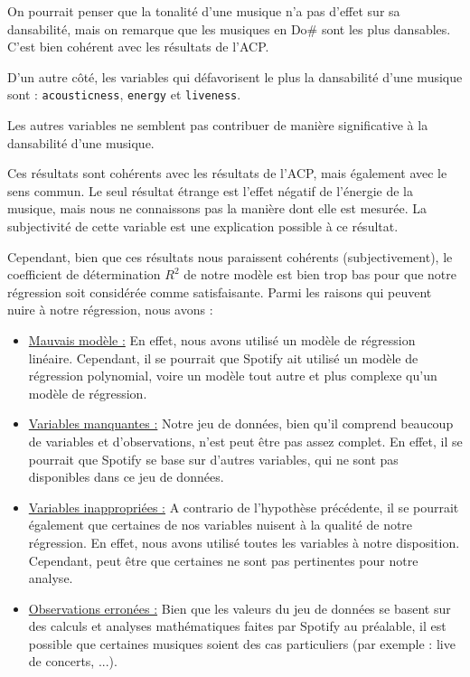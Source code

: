 \documentclass[a4paper, 12pt]{report}
\begin{document}
On pourrait penser que la tonalité d'une musique n'a pas d'effet sur sa dansabilité, mais on remarque que les musiques en Do\# sont les plus dansables. C'est bien cohérent avec les résultats de l'ACP.

D'un autre côté, les variables qui défavorisent le plus la dansabilité d'une musique sont : \verb|acousticness|, \verb|energy| et \verb|liveness|.

Les autres variables ne semblent pas contribuer de manière significative à la dansabilité d'une musique.

Ces résultats sont cohérents avec les résultats de l'ACP, mais également avec le sens commun. Le seul résultat étrange est l'effet négatif de l'énergie de la musique, mais nous ne connaissons pas la manière dont elle est mesurée. La subjectivité de cette variable est une explication possible à ce résultat.

Cependant, bien que ces résultats nous paraissent cohérents (subjectivement), le coefficient de détermination $R^2$ de notre modèle est bien trop bas pour que notre régression soit considérée comme satisfaisante. Parmi les raisons qui peuvent nuire à notre régression, nous avons : 

\begin{itemize}
    \item  \underline{Mauvais modèle :} En effet, nous avons utilisé un modèle de régression linéaire. Cependant, il se pourrait que Spotify ait utilisé un modèle de régression polynomial, voire un modèle tout autre et plus complexe qu'un modèle de régression.
    \item \underline{Variables manquantes :} Notre jeu de données, bien qu'il comprend beaucoup de variables et d'observations, n'est peut être pas assez complet. En effet, il se pourrait que Spotify se base sur d'autres variables, qui ne sont pas disponibles dans ce jeu de données.
    \item \underline{Variables inappropriées :} A contrario de l'hypothèse précédente, il se pourrait également que certaines de nos variables nuisent à la qualité de notre régression. En effet, nous avons utilisé toutes les variables à notre disposition. Cependant, peut être que certaines ne sont pas pertinentes pour notre analyse.
    \item \underline{Observations erronées :} Bien que les valeurs du jeu de données se basent sur des calculs et analyses mathématiques faites par Spotify au préalable, il est possible que certaines musiques soient des cas particuliers (par exemple : live de concerts, ...).
\end{itemize}
\end{document}
